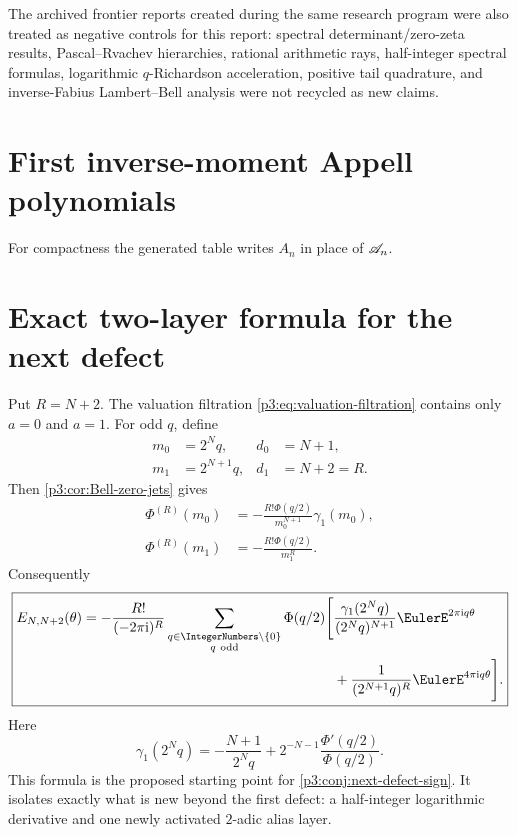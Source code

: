 \documentclass[11pt,oneside]{article}
\numberwithin{equation}{section}
\theoremstyle{definition}
\theoremstyle{remark}
\begin{document}
The archived frontier reports created during the same research program were also treated as negative controls for this report: spectral determinant/zero-zeta results, Pascal--Rvachev hierarchies, rational arithmetic rays, half-integer spectral formulas, logarithmic $q$-Richardson acceleration, positive tail quadrature, and inverse-Fabius Lambert--Bell analysis were not recycled as new claims.

\section{First inverse-moment Appell polynomials}
\label{p3:app:Appell-table}

For compactness the generated table writes $A_n$ in place of $\mathscr A_n$.


\section{Exact two-layer formula for the next defect}
\label{p3:app:next-defect}

Put $R=N+2$.  The valuation filtration \eqref{p3:eq:valuation-filtration} contains only $a=0$ and $a=1$.  For odd $q$, define
\begin{align}
 m_0&=2^Nq,&d_0&=N+1,\\
 m_1&=2^{N+1}q,&d_1&=N+2=R.
\end{align}
Then \cref{p3:cor:Bell-zero-jets} gives
\begin{align}
 \Phi^{(R)}(m_0)
 &=-\frac{R!\Phi(q/2)}{m_0^{N+1}}\gamma_1(m_0),
 \label{p3:eq:next-defect-layer0}\\
 \Phi^{(R)}(m_1)
 &=-\frac{R!\Phi(q/2)}{m_1^R}.
 \label{p3:eq:next-defect-layer1}
\end{align}
Consequently
\begin{equation}
\boxed{
\begin{aligned}
 E_{N,N+2}(\theta)
 =-\frac{R!}{(-2\pi\iu)^R}
 \sum_{\substack{q\in\IntegerNumbers\setminus\{0\}\\q\ \mathrm{odd}}}
 \Phi(q/2)\Bigg[&
 \frac{\gamma_1(2^Nq)}{(2^Nq)^{N+1}}
 \EulerE^{2\pi\iu q\theta}\\
 &+\frac{1}{(2^{N+1}q)^R}
 \EulerE^{4\pi\iu q\theta}\Bigg].
\end{aligned}}
\label{p3:eq:next-defect-exact}
\end{equation}
Here
\begin{equation}
 \gamma_1(2^Nq)
 =-\frac{N+1}{2^Nq}
 +2^{-N-1}\frac{\Phi'(q/2)}{\Phi(q/2)}.
 \label{p3:eq:next-defect-gamma1}
\end{equation}
This formula is the proposed starting point for \cref{p3:conj:next-defect-sign}.  It isolates exactly what is new beyond the first defect: a half-integer logarithmic derivative and one newly activated $2$-adic alias layer.
\end{document}

